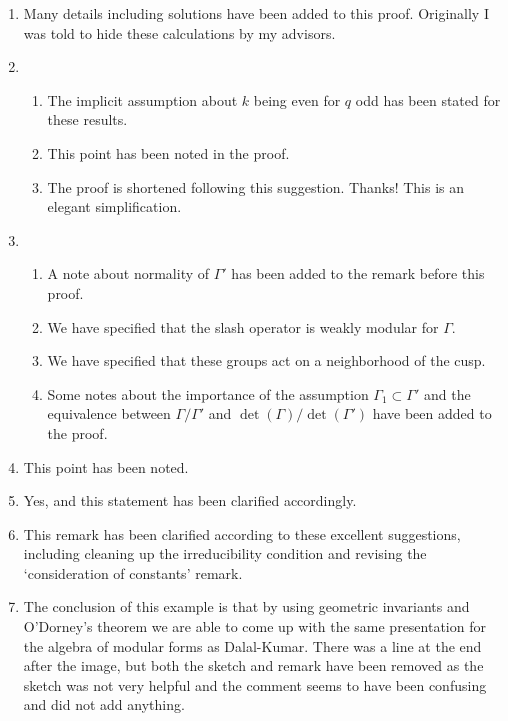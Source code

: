 \documentclass[12pt]{article}
\begin{document}
\begin{enumerate}
		\item Many details including solutions have been added to this proof. Originally I was told to hide these calculations by my advisors. 
		
		\item 
		\begin{enumerate}
			\item The implicit assumption about $k$ being even for $q$ odd has been stated for these results.
			\item This point has been noted in the proof.
			\item The proof is shortened following this suggestion. Thanks! This is an elegant simplification.
		\end{enumerate}
		
		\item	
		\begin{enumerate}
			\item A note about normality of $\Gamma'$ has been added to the remark before this proof.
			\item We have specified that the slash operator is weakly modular for $\Gamma.$
			\item We have specified that these groups act on a neighborhood of the cusp. 
			\item Some notes about the importance of the assumption $\Gamma_1\subset \Gamma'$ and the equivalence between $\Gamma/\Gamma'$ and $\operatorname{det}(\Gamma)/\operatorname{det}(\Gamma')$ have been added to the proof. 
		\end{enumerate}
		
		\item This point has been noted.
		
		\item Yes, and this statement has been clarified accordingly. 
		
		\item This remark has been clarified according to these excellent suggestions, including cleaning up the irreducibility condition and revising the `consideration of constants' remark.
		
		\item The conclusion of this example is that by using geometric invariants and O'Dorney's theorem we are able to come up with the same presentation for the algebra of modular forms as Dalal-Kumar. There was a line at the end after the image, but both the sketch and remark have been removed as the sketch was not very helpful and the comment seems to have been confusing and did not add anything.
		

\end{enumerate}
\end{document}
